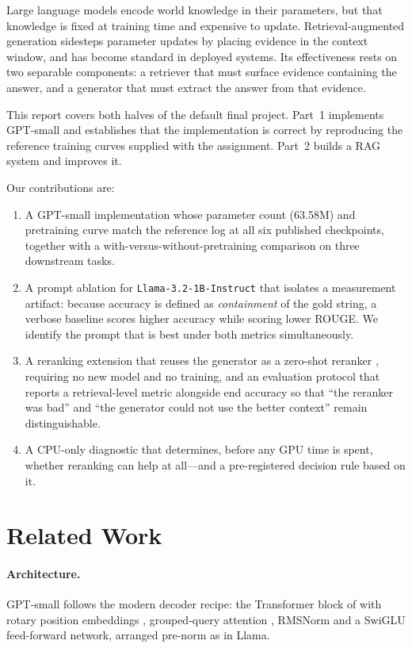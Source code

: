 \documentclass[11pt]{article}
\begin{document}
Large language models encode world knowledge in their parameters, but that knowledge is fixed
at training time and expensive to update. Retrieval-augmented generation
\citep{lewis2020rag} sidesteps parameter updates by placing evidence in the context window,
and has become standard in deployed systems. Its effectiveness rests on two separable
components: a retriever that must surface evidence containing the answer, and a generator
that must extract the answer from that evidence.

This report covers both halves of the default final project. Part~1 implements GPT-small and
establishes that the implementation is correct by reproducing the reference training curves
supplied with the assignment. Part~2 builds a RAG system and improves it.

Our contributions are:

\begin{enumerate}
\item A GPT-small implementation whose parameter count (63.58M) and pretraining curve match
      the reference log at all six published checkpoints, together with a
      with-versus-without-pretraining comparison on three downstream tasks.
\item A prompt ablation for \texttt{Llama-3.2-1B-Instruct} that isolates a measurement
      artifact: because accuracy is defined as \emph{containment} of the gold string, a
      verbose baseline scores higher accuracy while scoring lower ROUGE. We identify the
      prompt that is best under both metrics simultaneously.
\item A reranking extension that reuses the generator as a zero-shot reranker
      \citep{sachan2022upr}, requiring no new model and no training, and an evaluation
      protocol that reports a retrieval-level metric alongside end accuracy so that
      ``the reranker was bad'' and ``the generator could not use the better context'' remain
      distinguishable.
\item A CPU-only diagnostic that determines, before any GPU time is spent, whether reranking
      can help at all---and a pre-registered decision rule based on it.
\end{enumerate}

\section{Related Work}

\paragraph{Architecture.} GPT-small follows the modern decoder recipe: the Transformer block
of \citet{vaswani2017attention} with rotary position embeddings \citep{su2023roformer},
grouped-query attention \citep{ainslie2023gqa}, RMSNorm \citep{zhang2019rmsnorm} and a SwiGLU
feed-forward network, arranged pre-norm as in Llama.
\end{document}

